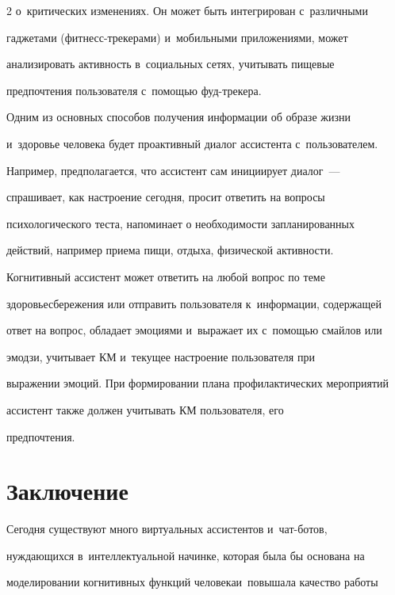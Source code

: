 \begin{multicols}{2}
о~критических изменениях. Он может быть интегрирован с~различными 


гаджетами (фит\-несс-тре\-ке\-ра\-ми) и~мобильными приложениями, может 


анализировать активность в~социальных сетях, учитывать пищевые 


предпочтения пользователя с~помощью фуд-тре\-кера. 


  


  Одним из основных способов получения информации об образе жизни 


и~здоровье человека будет проактивный диалог ассистента с~пользователем. 


Например, предполагается, что ассистент сам инициирует диалог~--- 


спрашивает, как настроение сегодня, просит ответить на вопросы 


психологического теста, напоминает о необходимости запланированных 


действий, например приема пищи, отдыха, физической активности. 


Когнитивный ассистент может ответить на любой вопрос по теме 


здо\-ровье\-сбе\-ре\-же\-ния или отправить пользователя к~информации, содержащей 


ответ на вопрос, обладает эмоциями и~выражает их с~помощью смайлов или 


эмодзи, учитывает КМ и~текущее настроение пользователя при 


выражении эмоций. При формировании плана профилактических мероприятий 


ассистент также должен учитывать КМ пользователя, его 


предпочтения. 





\section{Заключение}





  Сегодня существуют много виртуальных ас\-сис\-тен\-тов и~чат-бо\-тов, 


нуждающихся в~интеллектуальной начинке, которая была бы основана на 


моделировании когнитивных функций человека\linebreak и~повышала качество работы 



\end{multicols}
